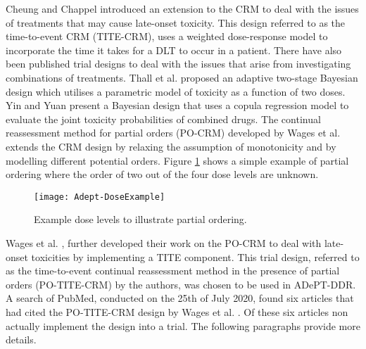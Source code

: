 Cheung and Chappel \cite{cheungSequentialDesignsPhase2000} introduced an extension to the CRM to deal with the issues of treatments that may cause late-onset toxicity. This design referred to as the time-to-event CRM (TITE-CRM), uses a weighted dose-response model to incorporate the time it takes for a DLT to occur in a patient. There have also been published trial designs to deal with the issues that arise from investigating combinations of treatments. Thall et al. \cite{thallDoseFindingTwoAgents2003} proposed an adaptive two-stage Bayesian design which utilises a parametric model of toxicity as a function of two doses. Yin and Yuan \cite{yinBayesianDoseFinding2009} present a Bayesian design that uses a copula regression model to evaluate the joint toxicity probabilities of combined drugs. The continual reassessment method for partial orders (PO-CRM) developed by Wages et al. \cite{wagesContinualReassessmentMethod2011} extends the CRM design by relaxing the assumption of monotonicity and by modelling different potential orders. Figure \ref{fig_adept:example_dose_levels} shows a simple example of partial ordering where the order of two out of the four dose levels are unknown. 

\begin{figure}[h!]
	\centering
	\caption{Example dose levels to illustrate partial ordering.}
	\label{fig_adept:example_dose_levels}
	\texttt{[image: Adept-DoseExample]}
\end{figure}

Wages et al. \cite{wagesUsingTimetoeventContinual2013}, \cite{wagesContinualReassessmentMethod2011} further developed their work on the PO-CRM to deal with late-onset toxicities by implementing a TITE component. This trial design, referred to as the time-to-event continual reassessment method in the presence of partial orders (PO-TITE-CRM) by the authors, was chosen to be used in ADePT-DDR. A search of PubMed, conducted on the 25th of July 2020, found six articles that had cited the PO-TITE-CRM design by Wages et al. \cite{wagesUsingTimetoeventContinual2013}. Of these six articles non actually implement the design into a trial. The following paragraphs provide more details. 

